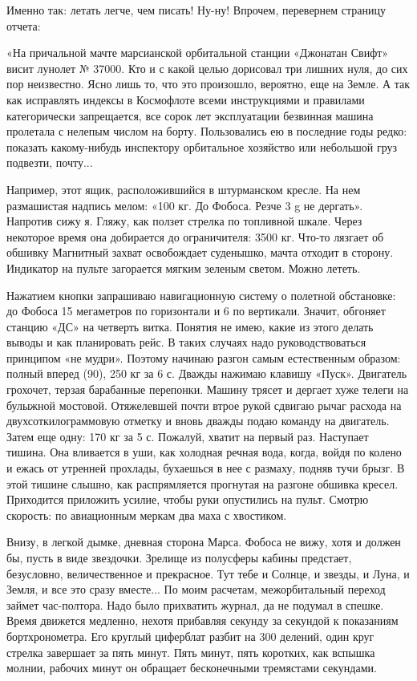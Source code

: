 \documentclass[11pt,a4paper,oneside]{article}
\begin{document}
Именно так: летать легче, чем писать! Ну-ну! Впрочем, перевернем страницу отчета:

«На причальной мачте марсианской орбитальной станции «Джонатан Свифт» висит лунолет № 37000. Кто и с какой целью дорисовал три лишних нуля, до сих пор неизвестно. Ясно лишь то, что это произошло, вероятно, еще на Земле. А так как исправлять индексы в Космофлоте всеми инструкциями и правилами категорически запрещается, все сорок лет эксплуатации безвинная машина пролетала с нелепым числом на борту. Пользовались ею в последние годы редко: показать какому-нибудь инспектору орбитальное хозяйство или небольшой груз подвезти, почту...

Например, этот ящик, расположившийся в штурманском кресле. На нем размашистая надпись мелом: «100 кг. До Фобоса. Резче 3 g не дергать». Напротив сижу я. Гляжу, как ползет стрелка по топливной шкале. Через некоторое время она добирается до ограничителя: 3500 кг. Что-то лязгает об обшивку Магнитный захват освобождает суденышко, мачта отходит в сторону. Индикатор на пульте загорается мягким зеленым светом. Можно лететь.

Нажатием кнопки запрашиваю навигационную систему о полетной обстановке: до Фобоса 15 мегаметров по горизонтали и 6 по вертикали. Значит, обгоняет станцию «ДС» на четверть витка. Понятия не имею, какие из этого делать выводы и как планировать рейс. В таких случаях надо руководствоваться принципом «не мудри». Поэтому начинаю разгон самым естественным образом: полный вперед (90\degree), 250 кг за 6 с. Дважды нажимаю клавишу «Пуск». Двигатель грохочет, терзая барабанные перепонки. Машину трясет и дергает хуже телеги на булыжной мостовой. Отяжелевшей почти втрое рукой сдвигаю рычаг расхода на двухсоткилограммовую отметку и вновь дважды подаю команду на двигатель. Затем еще одну: 170 кг за 5 с. Пожалуй, хватит на первый раз. Наступает тишина. Она вливается в уши, как холодная речная вода, когда, войдя по колено и ежась от утренней прохлады, бухаешься в нее с размаху, подняв тучи брызг. В этой тишине слышно, как распрямляется прогнутая на разгоне обшивка кресел. Приходится приложить усилие, чтобы руки опустились на пульт. Смотрю скорость: по авиационным меркам два маха с хвостиком.

Внизу, в легкой дымке, дневная сторона Марса. Фобоса не вижу, хотя и должен бы, пусть в виде звездочки. Зрелище из полусферы кабины предстает, безусловно, величественное и прекрасное. Тут тебе и Солнце, и звезды, и Луна, и Земля, и все это сразу вместе... По моим расчетам, межорбитальный переход займет час-полтора. Надо было прихватить журнал, да не подумал в спешке. Время движется медленно, нехотя прибавляя секунду за секундой к показаниям бортхронометра. Его круглый циферблат разбит на 300 делений, один круг стрелка завершает за пять минут. Пять минут, пять коротких, как вспышка молнии, рабочих минут он обращает бесконечными тремястами секундами.
\end{document}
